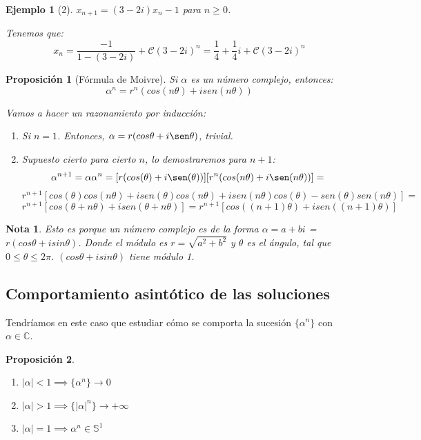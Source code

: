 \documentclass[11pt, a4paper, titlepage]{article}
\makeatletter
\renewenvironment{proof}[1][\proofname] {\vspace{-15pt}\par\pushQED{\qed}\normalfont\topsep6\p@\@plus6\p@\relax\trivlist\item[\hskip\labelsep\it#1\@addpunct{.}]\ignorespaces}{\popQED\endtrivlist\@endpefalse}
\theoremstyle{theorem-style}
\newtheorem*{nprop}{Proposición}
\theoremstyle{definition-style}
\theoremstyle{remark-style}
\newtheorem*{nota}{Nota}
\theoremstyle{example-style}
\newtheorem*{ejemplo}{Ejemplo}
\newenvironment{nlist}
{\begin{enumerate}
\renewcommand\labelenumi{(\emph{\roman{enumi})}}}
{\end{enumerate}}
\makeatother
\begin{document}
\begin{ejemplo}[2]
	$x_{n+1}=(3-2i)x_n -1$ para $n\geq 0$. 
	\begin{proof}[Solución]
	Tenemos que:
	\[
	x_n = \frac{-1}{1-(3-2i)}+\mathcal{C}(3-2i)^n = \frac{1}{4} + \frac{1}{4}i + \mathcal{C}(3-2i)^n
	\]
\end{proof}
\end{ejemplo}

\begin{nprop}[Fórmula de Moivre]
	Si $\alpha$ es un número complejo, entonces:
	\[
	\alpha^n = r^n(cos(n\theta) + i sen(n\theta))
	\]
	\begin{proof}
	Vamos a hacer un razonamiento por inducción:
	\begin{enumerate}
	\item Si $n=1$. Entonces, $\alpha = r(cos\theta +i\sen\theta)$, trivial.
	\item Supuesto cierto para cierto $n$, lo demostraremos para $n+1$:
	\[
	\alpha^{n+1} = \alpha\alpha^n =  [r(cos(\theta) +i\sen(\theta))] [r^n(cos(n\theta) +i\sen(n\theta))]=
	\]
	\[
	r^{n+1}[cos(\theta) cos(n\theta) +i sen(\theta) cos(n\theta) + isen(n\theta) cos(\theta) - sen(\theta) sen(n\theta)] = \]
	\[r^{n+1}[cos(\theta+n\theta)+isen(\theta+n\theta)] = r^{n+1}[cos((n+1)\theta)+isen((n+1)\theta)]
	\]
\end{enumerate}
	
\end{proof}
\end{nprop}

\begin{nota}
	Esto es porque un número complejo es de la forma $\alpha = a+bi$ = $r(cos\theta + i sin\theta)$.
	Donde el módulo es $r=\sqrt{a^2 + b^2}$ y $\theta$ es el ángulo, tal que $0 \leq \theta \leq 2\pi$.
	$(cos\theta + i sin\theta)$ tiene módulo 1.
	
\end{nota}

\subsection{Comportamiento asintótico de las soluciones}
Tendríamos en este caso que estudiar cómo se comporta la sucesión $\{\alpha^n\}$ con $\alpha \in \mathbb{C}$.
\begin{nprop}\hfill
\begin{nlist}
	\item $|\alpha|< 1 \implies \{\alpha^n\}\to 0$
	\item $|\alpha|> 1 \implies \{|\alpha|^n\}\to +\infty$
	\item $|\alpha| = 1 \implies \alpha^n \in \mathbb{S}^1$
\end{nlist}
	
\end{nprop}
\end{document}
